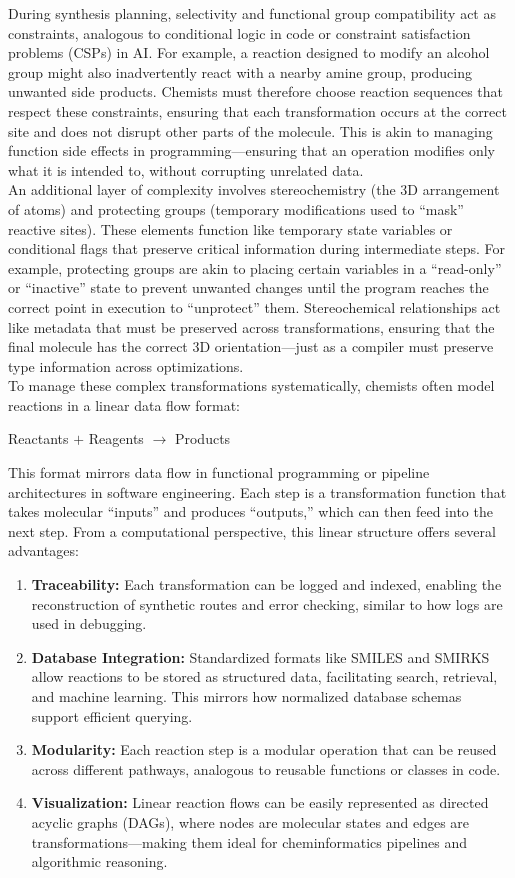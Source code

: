 \documentclass[12pt]{article}
\begin{document}
During synthesis planning, selectivity and functional group compatibility act as constraints, analogous to conditional logic in code or constraint satisfaction problems (CSPs) in AI.
For example, a reaction designed to modify an alcohol group might also inadvertently react with a nearby amine group, producing unwanted side products.
Chemists must therefore choose reaction sequences that respect these constraints, ensuring that each transformation occurs at the correct site and does not disrupt other parts of the molecule.
This is akin to managing function side effects in programming—ensuring that an operation modifies only what it is intended to, without corrupting unrelated data.
\\
\indent
An additional layer of complexity involves stereochemistry (the 3D arrangement of atoms) and protecting groups (temporary modifications used to “mask” reactive sites).
These elements function like temporary state variables or conditional flags that preserve critical information during intermediate steps.
For example, protecting groups are akin to placing certain variables in a “read-only” or “inactive” state to prevent unwanted changes until the program reaches the correct point in execution to “unprotect” them.
Stereochemical relationships act like metadata that must be preserved across transformations, ensuring that the final molecule has the correct 3D orientation—just as a compiler must preserve type information across optimizations.
\\
\indent
To manage these complex transformations systematically, chemists often model reactions in a linear data flow format:
\\
\begin{center}
{Reactants $+$ Reagents $\rightarrow$ Products}
\end{center}
\indent
This format mirrors data flow in functional programming or pipeline architectures in software engineering.
Each step is a transformation function that takes molecular “inputs” and produces “outputs,” which can then feed into the next step.
From a computational perspective, this linear structure offers several advantages:
\begin{enumerate}
    \item \textbf{Traceability:} Each transformation can be logged and indexed, enabling the reconstruction of synthetic routes and error checking, similar to how logs are used in debugging.
    \item \textbf{Database Integration:} Standardized formats like SMILES and SMIRKS allow reactions to be stored as structured data, facilitating search, retrieval, and machine learning. This mirrors how normalized database schemas support efficient querying.
    \item \textbf{Modularity:} Each reaction step is a modular operation that can be reused across different pathways, analogous to reusable functions or classes in code.
    \item \textbf{Visualization:} Linear reaction flows can be easily represented as directed acyclic graphs (DAGs), where nodes are molecular states and edges are transformations—making them ideal for cheminformatics pipelines and algorithmic reasoning.
\end{enumerate}
\end{document}
